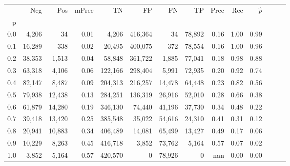 \begin{tabular}{rrrrrrrrrrrrrr}
\toprule
{} &     Neg &     Pos & mPrec &       TN &       FP &      FN &      TP &  Prec &   Rec & $\hat{p}$ \\
p   &         &         &       &          &          &         &         &       &       &           \\
\midrule
0.0 &   4,206 &      34 &  0.01 &    4,206 &  416,364 &      34 &  78,892 &  0.16 &  1.00 &      0.99 \\
0.1 &  16,289 &     338 &  0.02 &   20,495 &  400,075 &     372 &  78,554 &  0.16 &  1.00 &      0.96 \\
0.2 &  38,353 &   1,513 &  0.04 &   58,848 &  361,722 &   1,885 &  77,041 &  0.18 &  0.98 &      0.88 \\
0.3 &  63,318 &   4,106 &  0.06 &  122,166 &  298,404 &   5,991 &  72,935 &  0.20 &  0.92 &      0.74 \\
0.4 &  82,147 &   8,487 &  0.09 &  204,313 &  216,257 &  14,478 &  64,448 &  0.23 &  0.82 &      0.56 \\
0.5 &  79,938 &  12,438 &  0.13 &  284,251 &  136,319 &  26,916 &  52,010 &  0.28 &  0.66 &      0.38 \\
0.6 &  61,879 &  14,280 &  0.19 &  346,130 &   74,440 &  41,196 &  37,730 &  0.34 &  0.48 &      0.22 \\
0.7 &  39,418 &  13,420 &  0.25 &  385,548 &   35,022 &  54,616 &  24,310 &  0.41 &  0.31 &      0.12 \\
0.8 &  20,941 &  10,883 &  0.34 &  406,489 &   14,081 &  65,499 &  13,427 &  0.49 &  0.17 &      0.06 \\
0.9 &  10,229 &   8,263 &  0.45 &  416,718 &    3,852 &  73,762 &   5,164 &  0.57 &  0.07 &      0.02 \\
1.0 &   3,852 &   5,164 &  0.57 &  420,570 &        0 &  78,926 &       0 &   nan &  0.00 &      0.00 \\
\bottomrule
\end{tabular}
